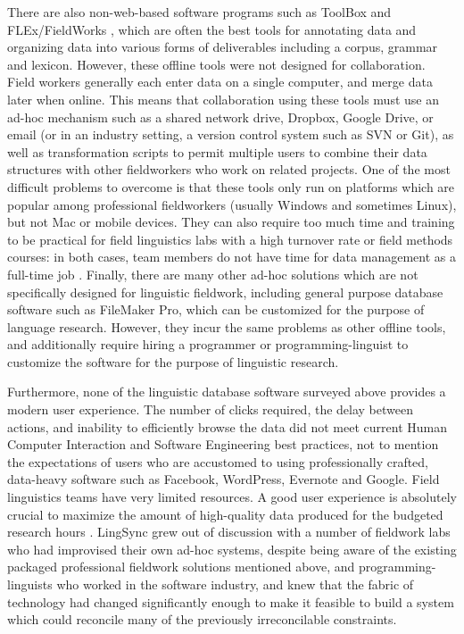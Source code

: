 \documentclass[letterpaper, 12pt, dvips]{mitwpl}
\begin{document}
There are also non-web-based software programs such as ToolBox \citep{ToolBox:2003:Online} 
and FLEx/FieldWorks
\citep{FLEx:2011:Online},
which are often the best tools for annotating
data and organizing data into various forms of deliverables  
including a corpus,
grammar and lexicon.
However, these offline tools were not designed for collaboration. 
Field workers generally each enter data on a single computer,
and merge data later when online.
This means that collaboration using these tools must use an ad-hoc mechanism such as a shared network drive, Dropbox, Google Drive, or email (or in an industry setting, a version control system such as SVN or Git),
as well as transformation scripts to permit multiple users to combine their data structures with other fieldworkers who work on related projects.
One of the most difficult problems to overcome is that 
these tools only run on platforms which are popular among professional fieldworkers  (usually Windows and sometimes Linux), but 
not Mac or mobile devices.
They can also require too much time and training to be practical for field linguistics labs with a high turnover rate or field methods courses: in both cases, team members do not have time for data management as a full-time job \citep{Butler:2007}. 
Finally, there are many other ad-hoc solutions which are not specifically designed for linguistic fieldwork, including general purpose database software such as FileMaker Pro,
which can be customized for the purpose of language research.
However,
they incur the same problems as other offline tools, and additionally require hiring a programmer or programming-linguist to customize the software for the purpose of linguistic research.

Furthermore, none of the linguistic database software surveyed above provides a modern user experience.
The number of clicks required, the delay between actions, and inability to efficiently browse the data did not meet current
Human Computer Interaction and Software Engineering best practices, 
not to mention the expectations of users who are accustomed to using professionally crafted, data-heavy software such as Facebook, WordPress, Evernote and Google. %
Field linguistics teams have very limited resources. 
A good user
experience is absolutely crucial to maximize the amount of high-quality data produced for the budgeted research hours \citep{Palmer:2009}. 
LingSync grew
out of discussion with a number of fieldwork labs who had improvised their own ad-hoc systems, 
despite being aware of the existing packaged professional fieldwork solutions mentioned above, 
and programming-linguists who worked in the software industry, and knew that the fabric of technology had changed significantly enough to make it feasible to build a system which could reconcile many of the previously irreconcilable constraints.
\end{document}
